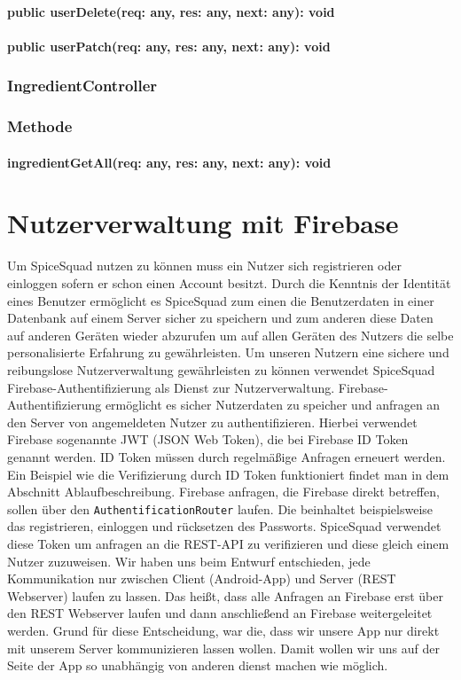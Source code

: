 \documentclass[parskip=full]{scrartcl}
\begin{document}
\paragraph{public userDelete(req: any, res: any, next: any): void}
\paragraph{public userPatch(req: any, res: any, next: any): void}

\subsubsection{IngredientController}
\subsubsection*{Methode}
\paragraph{ingredientGetAll(req: any, res: any, next: any): void}

\newpage

\section{Nutzerverwaltung mit Firebase}
Um SpiceSquad nutzen zu können muss ein Nutzer sich registrieren oder einloggen sofern er schon einen Account besitzt.
Durch die Kenntnis der Identität eines Benutzer ermöglicht es SpiceSquad zum einen die Benutzerdaten in einer Datenbank auf einem Server sicher zu speichern und zum anderen diese Daten auf anderen Geräten wieder abzurufen um auf allen Geräten des Nutzers die selbe personalisierte Erfahrung zu gewährleisten.
Um unseren Nutzern eine sichere und reibungslose Nutzerverwaltung gewährleisten zu können verwendet SpiceSquad Firebase-Authentifizierung als Dienst zur Nutzerverwaltung.
Firebase-Authentifizierung ermöglicht es sicher Nutzerdaten zu speicher und anfragen an den Server von angemeldeten Nutzer zu authentifizieren.
Hierbei verwendet Firebase sogenannte JWT (JSON Web Token), die bei Firebase ID Token genannt werden.
ID Token müssen durch regelmäßige Anfragen erneuert werden.
Ein Beispiel wie die Verifizierung durch ID Token funktioniert findet man in dem Abschnitt Ablaufbeschreibung.
Firebase anfragen, die Firebase direkt betreffen, sollen über den \texttt{AuthentificationRouter} laufen.
Die beinhaltet beispielsweise das registrieren, einloggen und rücksetzen des Passworts.
SpiceSquad verwendet diese Token um anfragen an die REST-API zu verifizieren und diese gleich einem Nutzer zuzuweisen.
Wir haben uns beim Entwurf entschieden, jede Kommunikation nur zwischen Client (Android-App) und Server (REST Webserver) laufen zu lassen. Das heißt, dass alle Anfragen an Firebase erst über den REST Webserver laufen und dann anschließend an Firebase weitergeleitet werden.
Grund für diese Entscheidung, war die, dass wir unsere App nur direkt mit unserem Server kommunizieren lassen wollen. Damit wollen wir uns auf der Seite der App so unabhängig von anderen dienst machen wie möglich.
\end{document}

